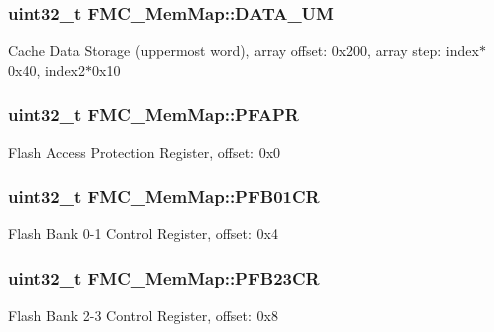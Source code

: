 \subsubsection[{D\+A\+T\+A\+\_\+\+U\+M}]{\setlength{\rightskip}{0pt plus 5cm}uint32\+\_\+t F\+M\+C\+\_\+\+Mem\+Map\+::\+D\+A\+T\+A\+\_\+\+U\+M}\label{struct_f_m_c___mem_map_ace662efebef446fe55b97873fc6e364a}
Cache Data Storage (uppermost word), array offset\+: 0x200, array step\+: index$\ast$0x40, index2$\ast$0x10 \hypertarget{struct_f_m_c___mem_map_a5b2a2d13262d7ed59ccc7b55e932797f}{}
\subsubsection[{P\+F\+A\+P\+R}]{\setlength{\rightskip}{0pt plus 5cm}uint32\+\_\+t F\+M\+C\+\_\+\+Mem\+Map\+::\+P\+F\+A\+P\+R}\label{struct_f_m_c___mem_map_a5b2a2d13262d7ed59ccc7b55e932797f}
Flash Access Protection Register, offset\+: 0x0 \hypertarget{struct_f_m_c___mem_map_acb79f316e430fb975751858e445bb38d}{}
\subsubsection[{P\+F\+B01\+C\+R}]{\setlength{\rightskip}{0pt plus 5cm}uint32\+\_\+t F\+M\+C\+\_\+\+Mem\+Map\+::\+P\+F\+B01\+C\+R}\label{struct_f_m_c___mem_map_acb79f316e430fb975751858e445bb38d}
Flash Bank 0-\/1 Control Register, offset\+: 0x4 \hypertarget{struct_f_m_c___mem_map_a014fa5ea0f1cc6c7bcf8ee762185fbe1}{}
\subsubsection[{P\+F\+B23\+C\+R}]{\setlength{\rightskip}{0pt plus 5cm}uint32\+\_\+t F\+M\+C\+\_\+\+Mem\+Map\+::\+P\+F\+B23\+C\+R}\label{struct_f_m_c___mem_map_a014fa5ea0f1cc6c7bcf8ee762185fbe1}
Flash Bank 2-\/3 Control Register, offset\+: 0x8 \hypertarget{struct_f_m_c___mem_map_aceee42cbeff95639e3a10a33f88ecb02}{}
